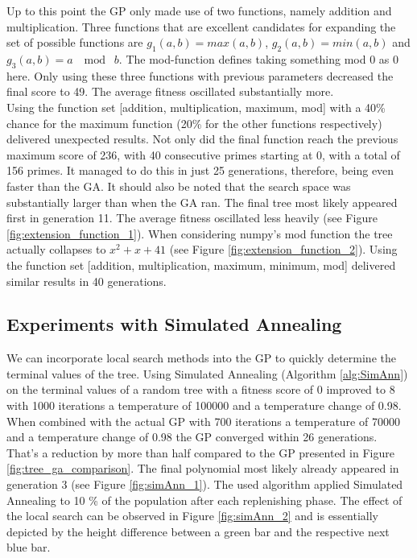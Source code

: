 \documentclass[11pt,a4paper]{article}
\begin{document}
Up to this point the GP only made use of two functions, namely addition and multiplication. Three functions that are excellent candidates for expanding the set of possible functions are $g_1(a, b)=max(a,b)$, $g_2(a, b)=min(a,b)$ and $g_3(a, b)= a \; \mod \; b$. The mod-function defines taking something mod 0 as 0 here. Only using these three functions with previous parameters decreased the final score to 49. The average fitness oscillated substantially more. 
\\
Using the function set [addition, multiplication, maximum, mod] with a 40\% chance for the maximum function (20\% for the other functions respectively) delivered unexpected results. Not only did the final function reach the previous maximum score of 236, with 40 consecutive primes starting at 0, with a total of 156 primes. It managed to do this in just 25 generations, therefore, being even faster than the GA. It should also be noted that the search space was substantially larger than when the GA ran. The final tree most likely appeared first in generation 11. The average fitness oscillated less heavily (see Figure \ref{fig:extension_function_1}). When considering numpy's mod function the tree actually collapses to $x^2 + x + 41$ (see Figure \ref{fig:extension_function_2}). Using the function set [addition, multiplication, maximum, minimum, mod] delivered similar results in 40 generations.
\subsection*{Experiments with Simulated Annealing}
We can incorporate local search methods into the GP to quickly determine the terminal values of the tree. Using Simulated Annealing (Algorithm \ref{alg:SimAnn}) on the terminal values of a random tree with a fitness score of 0 improved to 8 with 1000 iterations a temperature of 100000 and a temperature change of 0.98. When combined with the actual GP with 700 iterations a temperature of 70000 and a temperature change of 0.98 the GP converged within 26 generations. That's a reduction by more than half compared to the GP presented in Figure \ref{fig:tree_ga_comparison}. The final polynomial most likely already appeared in generation 3 (see Figure \ref{fig:simAnn_1}). The used algorithm applied Simulated Annealing to 10 \% of the population after each replenishing phase. The effect of the local search can be observed in Figure \ref{fig:simAnn_2} and is essentially depicted by the height difference between a green bar and the respective next blue bar.
\end{document}

